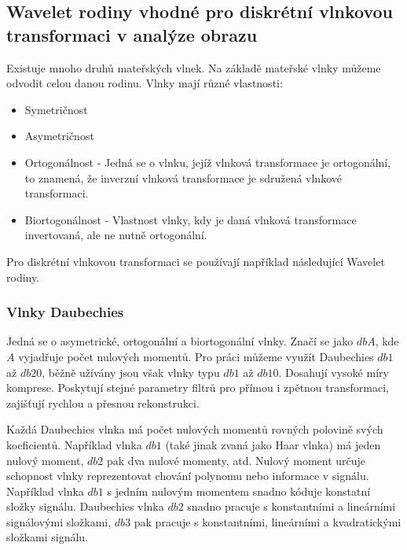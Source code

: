 \subsection{Wavelet rodiny vhodné pro diskrétní vlnkovou transformaci v analýze obrazu}
Existuje mnoho druhů mateřských vlnek. Na základě mateřské vlnky můžeme odvodit celou danou rodinu. Vlnky mají různé vlastnosti:\cite{PyWaveletsBrowser}
\begin{itemize}
    \item Symetričnost
    \item Asymetričnost
    \item Ortogonálnost - Jedná se o vlnku, jejíž vlnková transformace je ortogonální, to znamená, že inverzní vlnková transformace je sdružená vlnkové transformaci.\cite{WaveletBasics} 
    \item Biortogonálnost - Vlastnost vlnky, kdy je daná vlnková transformace invertovaná, ale ne nutně ortogonální. 
\end{itemize}

Pro diskrétní vlnkovou transformaci se používají například následující Wavelet rodiny.

\subsubsection{Vlnky Daubechies}

Jedná se o asymetrické, ortogonální a biortogonální vlnky. Značí se jako $dbA$, kde $A$ vyjadřuje počet nulových momentů. Pro práci můžeme využít Daubechies $db1$ až $db20$, běžně užívány jsou však vlnky typu $db1$ až $db10$.\cite{PyWaveletsBrowser} Dosahují vysoké míry komprese. Poskytují stejné parametry filtrů pro přímou i zpětnou transformaci, zajišťují rychlou a přesnou rekonstrukci.\cite{WaveletHlavac} 
    
Každá Daubechies vlnka má počet nulových momentů rovných polovině svých koeficientů. Například vlnka $db1$ (také jinak zvaná jako Haar vlnka) má jeden nulový moment, $db2$ pak dva nulové momenty, atd. Nulový moment určuje schopnost vlnky reprezentovat chování polynomu nebo informace v signálu. Například vlnka $db1$ s jedním nulovým momentem snadno kóduje konstatní složky signálu. Daubechies vlnka $db2$ snadno pracuje s konstantními a lineárními signálovými složkami, $db3$ pak pracuje s konstantními, lineárními a kvadratickými složkami signálu.\cite{WaveletsSignalImageProcessing}

